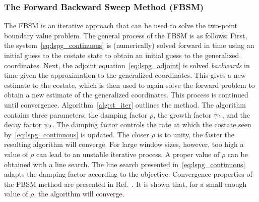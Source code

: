 \subsubsection{The Forward Backward Sweep Method (FBSM)}\label{sec:FBSM}


The FBSM is an iterative approach that can be used to
solve the two-point boundary value problem. The general process of the FBSM is
as follows: First, the system~\eqref{eq:lspg_continuous} is (numerically) solved forward in
time using an initial guess to the costate state to obtain an initial guess to
the generalized coordinates. Next, the adjoint equation~\eqref{eq:lspg_adjoint} is solved \textit{backwards} in time given the
approximation to the generalized coordinates. This gives a new estimate to the
costate, which is then used to again solve the forward problem to obtain
a new estimate of the generalized coordinates. This process is continued until
convergence. Algorithm~\ref{alg:st_iter} outlines the method. The algorithm
contains three parameters: the damping factor $\rho$, the growth factor
$\psi_1$, and the decay factor $\psi_2$. The damping factor controls the rate at which the costate seen by~\eqref{eq:lspg_continuous} is updated. The
closer $\rho$ is to unity, the faster the resulting algorithm will converge.
For large window sizes, however, too high a value of $\rho$ can lead to an unstable iterative process. 
A proper value of $\rho$ can be
obtained with a line search. The line search presented in~\eqref{eq:lspg_continuous} adapts the damping factor
according to the objective. Convergence properties of the FBSM method are
presented in Ref.~\cite{McAsey2012ConvergenceOT}. It is shown that, for a small 
enough value of $\rho$, the algorithm will converge.

